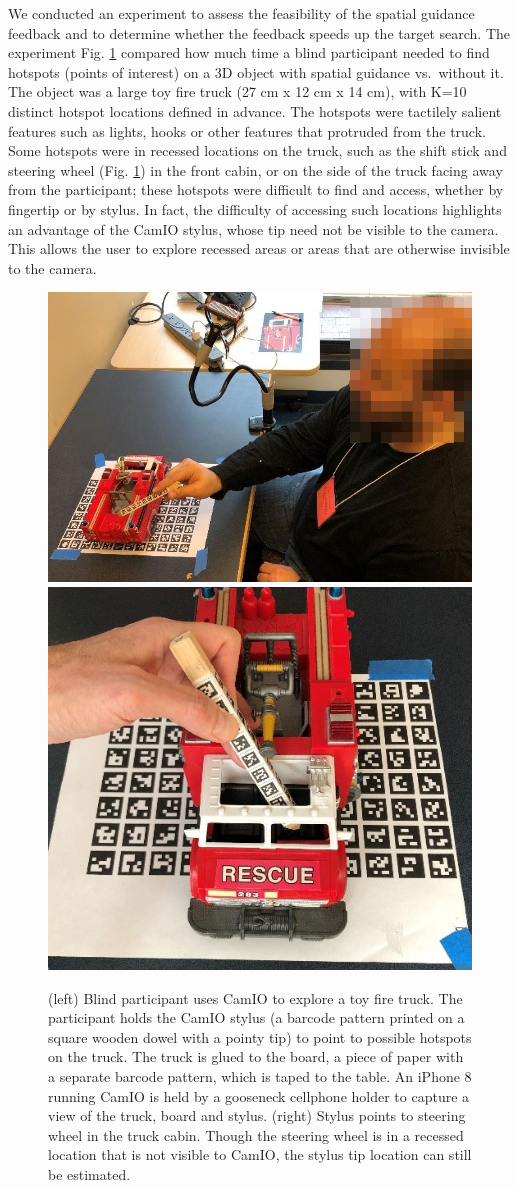 \documentclass[runningheads]{res/templates/llncs}
\begin{document}
We conducted an experiment to assess the feasibility of the spatial
guidance feedback and to determine whether the feedback speeds up the
target search. The experiment Fig. \ref{fig:exp} compared how much time a blind participant needed to find hotspots (points of interest) on a 3D
object with spatial guidance vs.~without it. The object was a large toy
fire truck (27 cm x 12 cm x 14 cm), with K=10 distinct hotspot locations
defined in advance. The hotspots were tactilely salient features such as
lights, hooks or other features that protruded from the truck. Some
hotspots were in recessed locations on the truck, such as the shift
stick and steering wheel (Fig. \ref{fig:exp}) in the front cabin, or on the
side of the truck facing away from the participant; these hotspots were
difficult to find and access, whether by fingertip or by stylus. In
fact, the difficulty of accessing such locations highlights an advantage
of the CamIO stylus, whose tip need not be visible to the camera. This
allows the user to explore recessed areas or areas that are otherwise
invisible to the camera.

\begin{figure}
\includegraphics[width=0.55\linewidth]{res/img/fig1a}
\includegraphics[width=0.45\linewidth]{res/img/fig1b} 
\caption{(left) Blind participant uses CamIO to explore a toy fire truck. The participant holds the CamIO stylus (a barcode pattern printed on a square wooden dowel with a pointy tip) to point to possible hotspots on the truck. The truck is glued to the board, a piece of paper with a separate barcode pattern, which is taped to the table. An iPhone 8 running CamIO is held by a gooseneck cellphone holder to capture a view of the truck, board and stylus. (right) Stylus points to steering wheel in the truck cabin. Though the steering wheel is in a recessed location that is not visible to CamIO, the stylus tip location can still be estimated.}
\label{fig:exp}
\end{figure}
\end{document}
